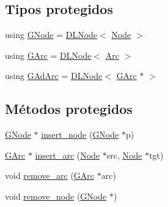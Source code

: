 \subsection*{Tipos protegidos}
\begin{DoxyCompactItemize}
\item 
using \hyperlink{class_designar_1_1_graph_a7e61951db0bb9bfa8a2e317440d4e17f}{G\+Node} = \hyperlink{class_designar_1_1_d_l_node}{D\+L\+Node}$<$ \hyperlink{class_designar_1_1_graph_a5dfc7dba9d092ac489c72e40390c37d0}{Node} $>$
\item 
using \hyperlink{class_designar_1_1_graph_a5ad9e18b71899c2d4979426e367e5573}{G\+Arc} = \hyperlink{class_designar_1_1_d_l_node}{D\+L\+Node}$<$ \hyperlink{class_designar_1_1_graph_a74c730ef4ce2d20f998d72bd25c2b5bf}{Arc} $>$
\item 
using \hyperlink{class_designar_1_1_graph_a7d00558995946c5653522148b54971bc}{G\+Ad\+Arc} = \hyperlink{class_designar_1_1_d_l_node}{D\+L\+Node}$<$ \hyperlink{class_designar_1_1_graph_a5ad9e18b71899c2d4979426e367e5573}{G\+Arc} $\ast$ $>$
\end{DoxyCompactItemize}
\subsection*{Métodos protegidos}
\begin{DoxyCompactItemize}
\item 
\hyperlink{class_designar_1_1_graph_a7e61951db0bb9bfa8a2e317440d4e17f}{G\+Node} $\ast$ \hyperlink{class_designar_1_1_graph_adea7e2c9bb1912cfc7a58990a640355d}{insert\+\_\+node} (\hyperlink{class_designar_1_1_graph_a7e61951db0bb9bfa8a2e317440d4e17f}{G\+Node} $\ast$p)
\item 
\hyperlink{class_designar_1_1_graph_a5ad9e18b71899c2d4979426e367e5573}{G\+Arc} $\ast$ \hyperlink{class_designar_1_1_graph_a20f183a1481fb62bc775aca6bd3244d1}{insert\+\_\+arc} (\hyperlink{class_designar_1_1_graph_a5dfc7dba9d092ac489c72e40390c37d0}{Node} $\ast$src, \hyperlink{class_designar_1_1_graph_a5dfc7dba9d092ac489c72e40390c37d0}{Node} $\ast$tgt)
\item 
void \hyperlink{class_designar_1_1_graph_a00f22c9d1c712f65cc46118e37cf06b9}{remove\+\_\+arc} (\hyperlink{class_designar_1_1_graph_a5ad9e18b71899c2d4979426e367e5573}{G\+Arc} $\ast$arc)
\item 
void \hyperlink{class_designar_1_1_graph_a4ca166ec5729c1402485dc45c040c11c}{remove\+\_\+node} (\hyperlink{class_designar_1_1_graph_a7e61951db0bb9bfa8a2e317440d4e17f}{G\+Node} $\ast$)
\end{DoxyCompactItemize}
